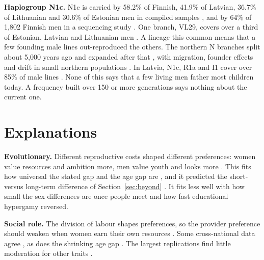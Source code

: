 \documentclass[conference,a4paper]{IEEEtran}
\begin{document}
\textbf{Haplogroup N1c.} N1c is carried by 58.2\% of Finnish, 41.9\% of Latvian, 36.7\% of Lithuanian and 30.6\% of Estonian men in compiled samples \cite{rootsi2007}, and by 64\% of 1,802 Finnish men in a sequencing study \cite{preussner2025}. One branch, VL29, covers over a third of Estonian, Latvian and Lithuanian men \cite{ilumae2016}. A lineage this common means that a few founding male lines out-reproduced the others. The northern N branches split about 5,000 years ago and expanded after that \cite{ilumae2016}, with migration, founder effects and drift in small northern populations \cite{rootsi2007,lappalainen2008}. In Latvia, N1c, R1a and I1 cover over 85\% of male lines \cite{pliss2015}. None of this says that a few living men father most children today. A frequency built over 150 or more generations says nothing about the current one.



\section{Explanations}
\label{sec:explain}
\textbf{Evolutionary.} Different reproductive costs shaped different preferences: women value resources and ambition more, men value youth and looks more \cite{buss1989,kenrick1992}. This fits how universal the stated gap and the age gap are \cite{walter2020}, and it predicted the short- versus long-term difference of Section~\ref{sec:beyond} \cite{buss1993}. It fits less well with how small the sex differences are once people meet \cite{eastwick2014} and how fast educational hypergamy reversed.

\textbf{Social role.} The division of labour shapes preferences, so the provider preference should weaken when women earn their own resources \cite{eagly1999,wood2002}. Some cross-national data agree \cite{kasser1999,zentner2012}, as does the shrinking age gap \cite{walter2020}. The largest replications find little moderation for other traits \cite{zhang2019,walter2020}.
\end{document}
